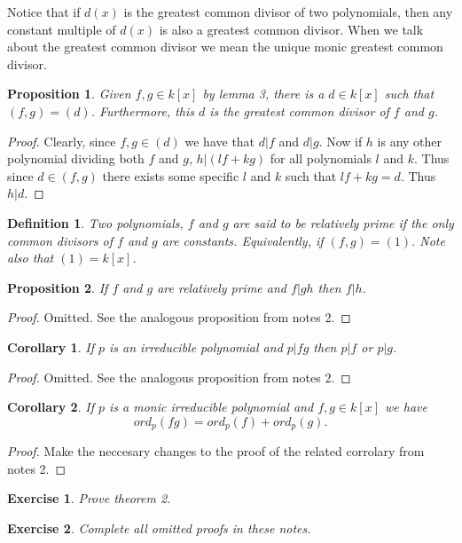\documentclass{article}
\theoremstyle{problemstyle}
\newtheorem{proposition}{Proposition}
\newtheorem{corollary}{Corollary}
\newtheorem{exercise}{Exercise}
\newtheorem{definition}{Definition}
\begin{document}
Notice that if $d(x)$ is the greatest common divisor of two polynomials, then any constant multiple of $d(x)$ is also a greatest common divisor. When we talk about the greatest common divisor we mean the unique monic greatest common divisor. 

\begin{proposition}
Given $f,g \in k[x]$ by lemma 3, there is a $d \in k[x]$ such that $(f,g) = (d)$. Furthermore, this $d$ is the greatest common divisor of $f$ and $g$. 
\end{proposition}

\begin{proof}
Clearly, since $f,g \in (d)$ we have that $d|f$ and $d|g$. Now if $h$ is any other polynomial dividing both $f$ and $g$, $h|(lf+kg)$ for all polynomials $l$ and $k$. Thus since $d \in (f,g)$ there exists some specific $l$ and $k$ such that $lf+kg = d$. Thus $h|d$. 
\end{proof}

\begin{definition}
Two polynomials, $f$ and $g$ are said to be relatively prime if the only common divisors of $f$ and $g$ are constants. Equivalently, if $(f,g) = (1)$. Note also that $(1) = k[x]$. 
\end{definition}

\begin{proposition}
If $f$ and $g$ are relatively prime and $f|gh$ then $f|h$. 
\end{proposition}

\begin{proof}
Omitted. See the analogous proposition from notes 2. 
\end{proof}

\begin{corollary}
If $p$ is an irreducible polynomial and $p|fg$ then $p|f$ or $p|g$. 
\end{corollary}

\begin{proof}
Omitted. See the analogous proposition from notes 2. 
\end{proof}

\begin{corollary}
If $p$ is a monic irreducible polynomial and $f,g\in k[x]$ we have $$ord_p(fg) = ord_p(f)+ord_p(g).$$
\end{corollary}

\begin{proof}
Make the neccesary changes to the proof of the related corrolary from notes 2. 
\end{proof}

\begin{exercise}
Prove theorem 2. 
\end{exercise}

\begin{exercise}
Complete all omitted proofs in these notes. 
\end{exercise}
\end{document}
